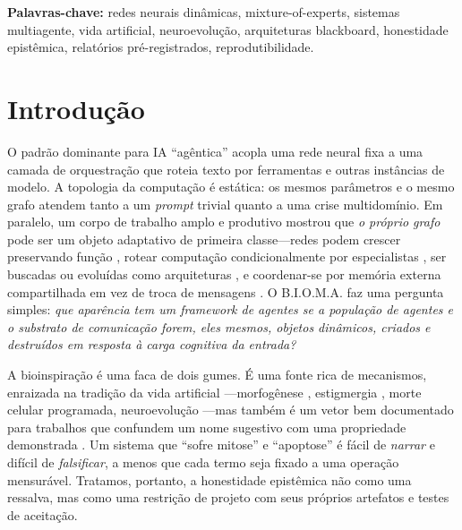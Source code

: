 \documentclass[11pt]{article}
\newcommand{\bioma}{\textsc{B.I.O.M.A.}}
\begin{document}
\medskip
\noindent\textbf{Palavras-chave:} redes neurais dinâmicas, mixture-of-experts,
sistemas multiagente, vida artificial, neuroevolução, arquiteturas blackboard,
honestidade epistêmica, relatórios pré-registrados, reprodutibilidade.

\section{Introdução}
O padrão dominante para IA ``agêntica'' acopla uma rede neural fixa a uma camada
de orquestração que roteia texto por ferramentas e outras instâncias de modelo.
A topologia da computação é estática: os mesmos parâmetros e o mesmo grafo
atendem tanto a um \emph{prompt} trivial quanto a uma crise multidomínio. Em
paralelo, um corpo de trabalho amplo e produtivo mostrou que \emph{o próprio
grafo} pode ser um objeto adaptativo de primeira classe---redes podem crescer
preservando função \cite{chen2016net2net,rusu2016progressive,yoon2018den},
rotear computação condicionalmente por especialistas
\cite{shazeer2017moe,fedus2022switch}, ser buscadas ou evoluídas como
arquiteturas \cite{zoph2017nas,elsken2019nas,real2019amoeba,stanley2002neat}, e
coordenar-se por memória externa compartilhada em vez de troca de mensagens
\cite{graves2016dnc,hayesroth1985blackboard}. O \bioma{} faz uma pergunta
simples: \emph{que aparência tem um framework de agentes se a população de
agentes e o substrato de comunicação forem, eles mesmos, objetos dinâmicos,
criados e destruídos em resposta à carga cognitiva da entrada?}

A bioinspiração é uma faca de dois gumes. É uma fonte rica de mecanismos,
enraizada na tradição da vida artificial \cite{langton1989alife}---morfogênese
\cite{mordvintsev2020growing}, estigmergia \cite{dorigo1996ant}, morte celular
programada, neuroevolução \cite{stanley2019neuroevolution}---mas também é um vetor
bem documentado para trabalhos que confundem um nome sugestivo com uma
propriedade demonstrada \cite{lipton2019troubling}. Um sistema que ``sofre
mitose'' e ``apoptose'' é fácil de \emph{narrar} e difícil de \emph{falsificar},
a menos que cada termo seja fixado a uma operação mensurável. Tratamos, portanto,
a honestidade epistêmica não como uma ressalva, mas como uma restrição de projeto
com seus próprios artefatos e testes de aceitação.
\end{document}
